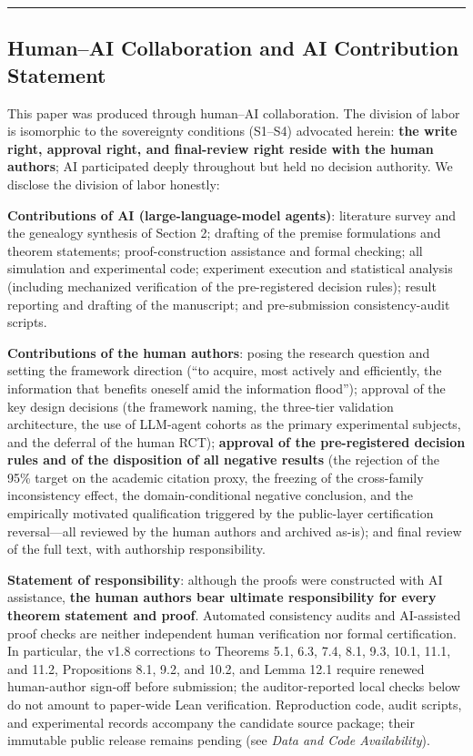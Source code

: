 \documentclass[
  11pt]{article}
\begin{document}
\begin{center}\rule{0.5\linewidth}{0.5pt}\end{center}

\subsection{Human--AI Collaboration and AI Contribution
Statement}\label{humanai-collaboration-and-ai-contribution-statement}

This paper was produced through human--AI collaboration. The division of
labor is isomorphic to the sovereignty conditions (S1--S4) advocated
herein: \textbf{the write right, approval right, and final-review right
reside with the human authors}; AI participated deeply throughout but
held no decision authority. We disclose the division of labor honestly:

\textbf{Contributions of AI (large-language-model agents)}: literature
survey and the genealogy synthesis of Section 2; drafting of the premise
formulations and theorem statements; proof-construction assistance and
formal checking; all simulation and experimental code; experiment
execution and statistical analysis (including mechanized verification of
the pre-registered decision rules); result reporting and drafting of the
manuscript; and pre-submission consistency-audit scripts.

\textbf{Contributions of the human authors}: posing the research
question and setting the framework direction (``to acquire, most
actively and efficiently, the information that benefits oneself amid the
information flood''); approval of the key design decisions (the
framework naming, the three-tier validation architecture, the use of
LLM-agent cohorts as the primary experimental subjects, and the deferral
of the human RCT); \textbf{approval of the pre-registered decision rules
and of the disposition of all negative results} (the rejection of the
95\% target on the academic citation proxy, the freezing of the
cross-family inconsistency effect, the domain-conditional negative
conclusion, and the empirically motivated qualification triggered by the
public-layer certification reversal---all reviewed by the human authors
and archived as-is); and final review of the full text, with authorship
responsibility.

\textbf{Statement of responsibility}: although the proofs were
constructed with AI assistance, \textbf{the human authors bear ultimate
responsibility for every theorem statement and proof}. Automated
consistency audits and AI-assisted proof checks are neither independent
human verification nor formal certification. In particular, the v1.8
corrections to Theorems 5.1, 6.3, 7.4, 8.1, 9.3, 10.1, 11.1, and 11.2,
Propositions 8.1, 9.2, and 10.2, and Lemma 12.1 require renewed
human-author sign-off before submission; the auditor-reported local
checks below do not amount to paper-wide Lean verification. Reproduction
code, audit scripts, and experimental records accompany the candidate
source package; their immutable public release remains pending (see
\emph{Data and Code Availability}).
\end{document}
